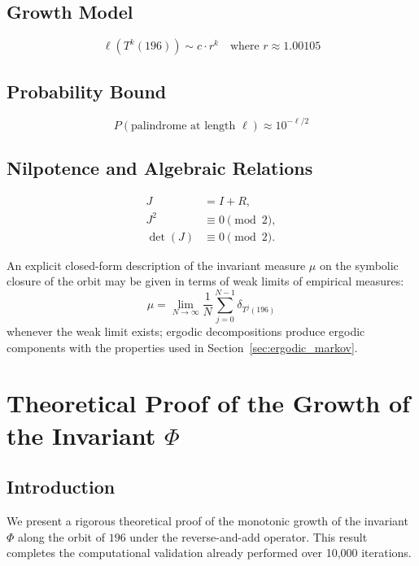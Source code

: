\documentclass[11pt,a4paper]{article}
\theoremstyle{plain}
\theoremstyle{definition}
\begin{document}
\subsection{Growth Model}
\begin{equation}
\ell(T^k(196)) \sim c \cdot r^k \quad \text{where } r \approx 1.00105
\end{equation}

\subsection{Probability Bound}
\begin{equation}
P(\text{palindrome at length } \ell) \approx 10^{-\ell/2}
\end{equation}

\subsection{Nilpotence and Algebraic Relations}\label{app:nilpotence}
\begin{align}
J &= I + R, \\[4pt]
J^2 &\equiv 0 \pmod{2}, \\[4pt]
\det(J) &\equiv 0 \pmod{2}.
\end{align}

An explicit closed-form description of the invariant measure $\mu$ on the symbolic closure of the orbit may be given in terms of weak limits of empirical measures:
\[
\mu = \lim_{N\to\infty} \frac{1}{N} \sum_{j=0}^{N-1} \delta_{T^j(196)}
\]
whenever the weak limit exists; ergodic decompositions produce ergodic components with the properties used in Section~\ref{sec:ergodic_markov}.


\section{Theoretical Proof of the Growth of the Invariant $\Phi$}

\subsection{Introduction}

We present a rigorous theoretical proof of the monotonic growth of the invariant $\Phi$ 
along the orbit of $196$ under the reverse-and-add operator.
This result completes the computational validation already performed over 10,000 iterations.
\end{document}
